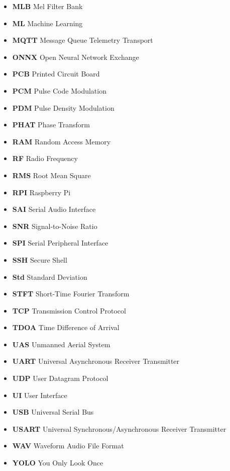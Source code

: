 \begin{itemize}
    \item \textbf{MLB} Mel Filter Bank
    \item \textbf{ML} Machine Learning
    \item \textbf{MQTT} Message Queue Telemetry Transport
    \item \textbf{ONNX} Open Neural Network Exchange
    \item \textbf{PCB} Printed Circuit Board
    \item \textbf{PCM} Pulse Code Modulation
    \item \textbf{PDM} Pulse Density Modulation
    \item \textbf{PHAT} Phase Transform
    \item \textbf{RAM} Random Access Memory
    \item \textbf{RF} Radio Frequency
    \item \textbf{RMS} Root Mean Square
    \item \textbf{RPI} Raspberry Pi
    \item \textbf{SAI} Serial Audio Interface
    \item \textbf{SNR} Signal-to-Noise Ratio
    \item \textbf{SPI} Serial Peripheral Interface
    \item \textbf{SSH} Secure Shell
    \item \textbf{Std} Standard Deviation
    \item \textbf{STFT} Short-Time Fourier Transform
    \item \textbf{TCP} Transmission Control Protocol
    \item \textbf{TDOA} Time Difference of Arrival
    \item \textbf{UAS} Unmanned Aerial System
    \item \textbf{UART} Universal Asynchronous Receiver Transmitter
    \item \textbf{UDP} User Datagram Protocol
    \item \textbf{UI} User Interface
    \item \textbf{USB} Universal Serial Bus
    \item \textbf{USART} Universal Synchronous/Asynchronous Receiver Transmitter
    \item \textbf{WAV} Waveform Audio File Format
    \item \textbf{YOLO} You Only Look Once
\end{itemize}